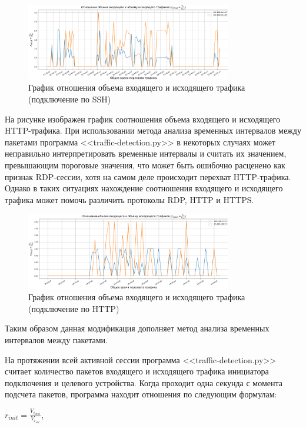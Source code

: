\documentclass[bachelor, och, coursework]{SCWorks}
\begin{document}
\begin{figure}[H]
  \centering
  \includegraphics[width=0.8\textwidth]{photo/inout-ssh.png}
  \caption{График отношения объема входящего и исходящего трафика (подключение по SSH)}
  \label{ssh-inout}
\end{figure}

На рисунке изображен график соотношения объема входящего и исходящего HTTP-трафика. 
При использовании метода анализа временных интервалов между пакетами программа <<traffic-detection.py>> 
в некоторых случаях может неправильно интерпретировать временные интервалы и считать их значением, превышающим пороговые значения, 
что может быть ошибочно расценено как признак RDP-сессии, хотя на самом деле происходит перехват HTTP-трафика. Однако в таких 
ситуациях нахождение соотношения входящего и исходящего трафика может помочь различить протоколы RDP, HTTP и HTTPS.

\begin{figure}[H]
  \centering
  \includegraphics[width=0.8\textwidth]{photo/inout-http.png}
  \caption{График отношения объема входящего и исходящего трафика (подключение по HTTP)}
  \label{http-inout}
\end{figure}

Таким образом данная модификация дополняет метод анализа временных интервалов между пакетами.

На протяжении всей активной сессии программа <<traffic-detection.py>> считает количество пакетов входящего и исходящего трафика
инициатора подключения и целевого устройства. Когда проходит одна секунда с момента подсчета пакетов, программа находит отношения
по следующим формулам:

\begin{center}
  $r_{init} = \frac{V_{i_{dest}}}{V_{i_{src}}}$,
\end{center}
\end{document}
